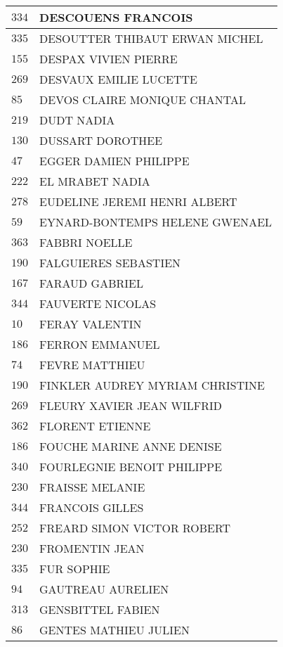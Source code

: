 \begin{xltabular}{\linewidth}{|l|X|}
    \hline
    $334$ & DESCOUENS FRANCOIS \\
    \hline
    $335$ & DESOUTTER THIBAUT ERWAN MICHEL \\
    \hline
    $155$ & DESPAX VIVIEN PIERRE \\
    \hline
    $269$ & DESVAUX EMILIE LUCETTE \\
    \hline
    $85$ & DEVOS CLAIRE MONIQUE CHANTAL \\
    \hline
    $219$ & DUDT NADIA \\
    \hline
    $130$ & DUSSART DOROTHEE \\
    \hline
    $47$ & EGGER DAMIEN PHILIPPE \\
    \hline
    $222$ & EL MRABET NADIA \\
    \hline
    $278$ & EUDELINE JEREMI HENRI ALBERT \\
    \hline
    $59$ & EYNARD-BONTEMPS HELENE GWENAEL \\
    \hline
    $363$ & FABBRI NOELLE \\
    \hline
    $190$ & FALGUIERES SEBASTIEN \\
    \hline
    $167$ & FARAUD GABRIEL \\
    \hline
    $344$ & FAUVERTE NICOLAS \\
    \hline
    $10$ & FERAY VALENTIN \\
    \hline
    $186$ & FERRON EMMANUEL \\
    \hline
    $74$ & FEVRE MATTHIEU \\
    \hline
    $190$ & FINKLER AUDREY MYRIAM CHRISTINE \\
    \hline
    $269$ & FLEURY XAVIER JEAN WILFRID \\
    \hline
    $362$ & FLORENT ETIENNE \\
    \hline
    $186$ & FOUCHE MARINE ANNE DENISE \\
    \hline
    $340$ & FOURLEGNIE BENOIT PHILIPPE \\
    \hline
    $230$ & FRAISSE MELANIE \\
    \hline
    $344$ & FRANCOIS GILLES \\
    \hline
    $252$ & FREARD SIMON VICTOR ROBERT \\
    \hline
    $230$ & FROMENTIN JEAN \\
    \hline
    $335$ & FUR SOPHIE \\
    \hline
    $94$ & GAUTREAU AURELIEN \\
    \hline
    $313$ & GENSBITTEL FABIEN \\
    \hline
    $86$ & GENTES MATHIEU JULIEN \\

\end{xltabular}
